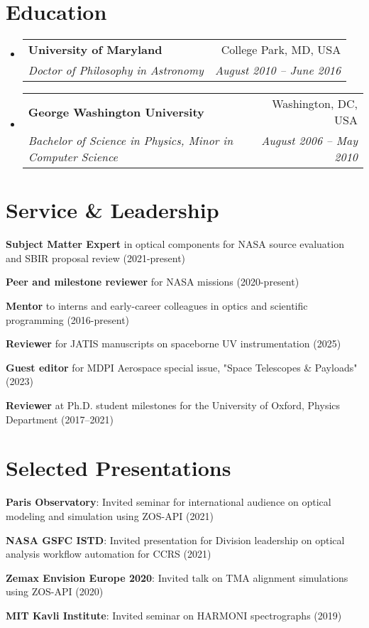 \documentclass[letterpaper,11pt]{article}
\makeatletter
\newcommand{\resumeSubheading}[4]{
  \vspace{-2pt}\item
    \begin{tabular*}{0.97\textwidth}[t]{l@{\extracolsep{\fill}}r}
      \textbf{#1} & #2 \\
      \textit{\small#3} & \textit{\small #4} \\
    \end{tabular*}\vspace{-7pt}
}
\newcommand{\resumeSubHeadingListStart}{\begin{itemize}[leftmargin=0.15in, label={}]}
\newcommand{\resumeSubHeadingListEnd}{\end{itemize}}
\makeatother
\begin{document}
\section{Education}
\resumeSubHeadingListStart
    \resumeSubheading
      {University of Maryland}{College Park, MD, USA}
      {Doctor of Philosophy in Astronomy}{August 2010 -- June 2016}
    \resumeSubheading
      {George Washington University}{Washington, DC, USA}
      {Bachelor of Science in Physics, Minor in Computer Science}{August 2006 -- May 2010}
\resumeSubHeadingListEnd

\section{Service \& Leadership}
\begin{itemize}[leftmargin=0.15in, label={}, noitemsep, topsep=0pt]
    \small{
        \item{\textbf{Subject Matter Expert}{ in optical components for NASA source evaluation and SBIR proposal review (2021-present)}}
        \item{\textbf{Peer and milestone reviewer}{ for NASA missions (2020-present)}}
        \item{\textbf{Mentor}{ to interns and early-career colleagues in optics and scientific programming (2016-present)}}
        \item{\textbf{Reviewer}{ for JATIS manuscripts on spaceborne UV instrumentation (2025)}}
        \item{\textbf{Guest editor}{ for MDPI Aerospace special issue, "Space Telescopes \& Payloads" (2023)}}
        \item{\textbf{Reviewer}{ at Ph.D. student milestones for the University of Oxford, Physics Department (2017–2021)}}
    }
\end{itemize}

\section{Selected Presentations}
\begin{itemize}[leftmargin=0.15in, label={}, noitemsep, topsep=0pt]
    \small{
        \item{\textbf{Paris Observatory}{: Invited seminar for international audience on optical modeling and simulation using ZOS-API (2021)}}
        \item{\textbf{NASA GSFC ISTD}{: Invited presentation for Division leadership on optical analysis workflow automation for CCRS (2021)}}
        \item{\textbf{Zemax Envision Europe 2020}{: Invited talk on TMA alignment simulations using ZOS-API (2020)}}
        \item{\textbf{MIT Kavli Institute}{: Invited seminar on HARMONI spectrographs (2019)}}
    }
\end{itemize}
\end{document}
